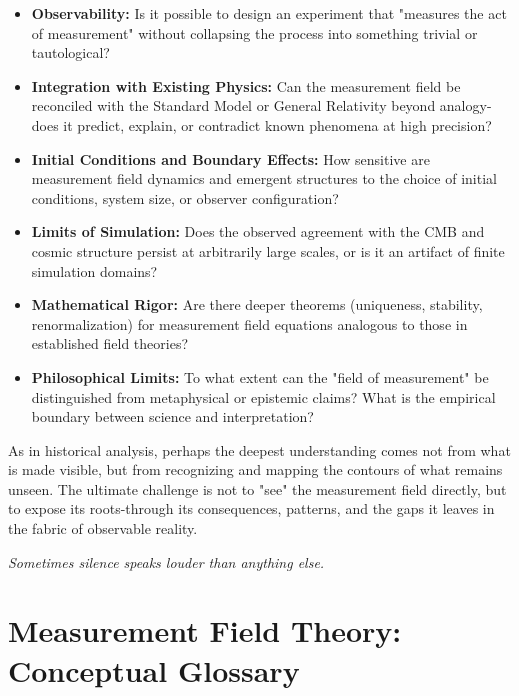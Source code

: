 \begin{itemize}
  \item \textbf{Observability:} Is it possible to design an experiment that "measures the act of measurement" without collapsing the process into something trivial or tautological?
  \item \textbf{Integration with Existing Physics:} Can the measurement field be reconciled with the Standard Model or General Relativity beyond analogy-does it predict, explain, or contradict known phenomena at high precision?
  \item \textbf{Initial Conditions and Boundary Effects:} How sensitive are measurement field dynamics and emergent structures to the choice of initial conditions, system size, or observer configuration?
  \item \textbf{Limits of Simulation:} Does the observed agreement with the CMB and cosmic structure persist at arbitrarily large scales, or is it an artifact of finite simulation domains?
  \item \textbf{Mathematical Rigor:} Are there deeper theorems (uniqueness, stability, renormalization) for measurement field equations analogous to those in established field theories?
  \item \textbf{Philosophical Limits:} To what extent can the "field of measurement" be distinguished from metaphysical or epistemic claims? What is the empirical boundary between science and interpretation?
\end{itemize}

As in historical analysis, perhaps the deepest understanding comes not from what is made visible, but from recognizing and mapping the contours of what remains unseen. The ultimate challenge is not to "see" the measurement field directly, but to expose its roots-through its consequences, patterns, and the gaps it leaves in the fabric of observable reality.




\emph{Sometimes silence speaks louder than anything else.} 

\appendix
\section*{Measurement Field Theory: Conceptual Glossary}
\label{app:glossary}

